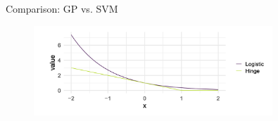 \begin{vbframe}{Comparison: GP vs. SVM }
\begin{figure}
\includegraphics[width=0.8\textwidth]{figure_man/gp-vs-svm.png}
\end{figure}

\end{vbframe}

\endlecture
